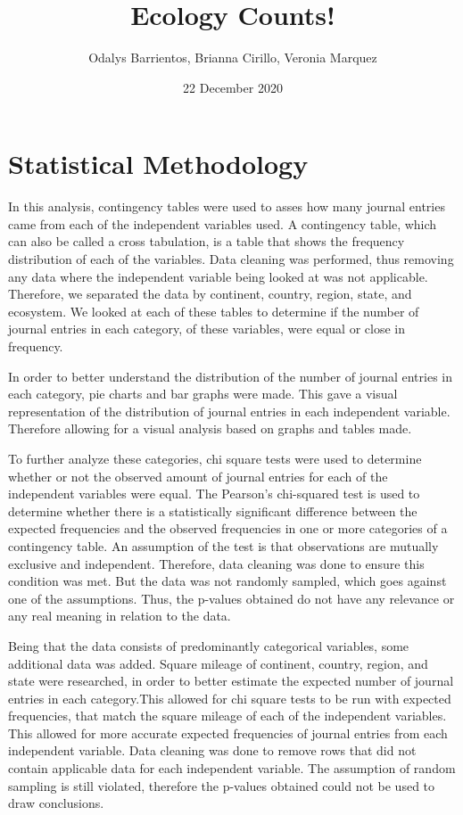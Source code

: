 \documentclass[12pt, letterpaper]{article}
\title{Ecology Counts!}
\author{Odalys Barrientos, Brianna Cirillo, Veronia Marquez}
\date{22 December 2020}
\begin{document}
\maketitle

\section{Statistical Methodology}
In this analysis, contingency tables were used to asses how many journal entries came from each of the independent variables used. A contingency table, which can also be called a cross tabulation, is a table that shows the frequency distribution of each of the variables. Data cleaning was performed, thus removing any data where the independent variable being looked at was not applicable. Therefore, we separated the data by continent, country, region, state, and ecosystem. We looked at each of these tables to determine if the number of journal entries in each category, of these variables, were equal or close in frequency. 

In order to better understand the distribution of the number of journal entries in each category, pie charts and bar graphs were made. This gave a visual representation of the distribution of journal entries in each independent variable. Therefore allowing for a visual analysis based on graphs and tables made.

To further analyze these categories, chi square tests were used to determine whether or not the observed amount of journal entries for each of the independent variables were equal. The Pearson's chi-squared test is used to determine whether there is a statistically significant difference between the expected frequencies and the observed frequencies in one or more categories of a contingency table. An assumption of the test is that observations are mutually exclusive and independent. Therefore, data cleaning was done to ensure this condition was met. But the data was not randomly sampled, which goes against one of the assumptions. Thus, the p-values obtained do not have any relevance or any real meaning in relation to the data.

Being that the data consists of predominantly categorical variables, some additional data was added. Square mileage of continent, country, region, and state were researched, in order to better estimate the expected number of journal entries in each category.This allowed for chi square tests to be run with expected frequencies, that match the square mileage of each of the independent variables. This allowed for more accurate expected frequencies of journal entries from each independent variable. Data cleaning was done to remove rows that did not contain applicable data for each independent variable. The assumption of random sampling is still violated, therefore the p-values obtained could not be used to draw conclusions.
\end{document}
